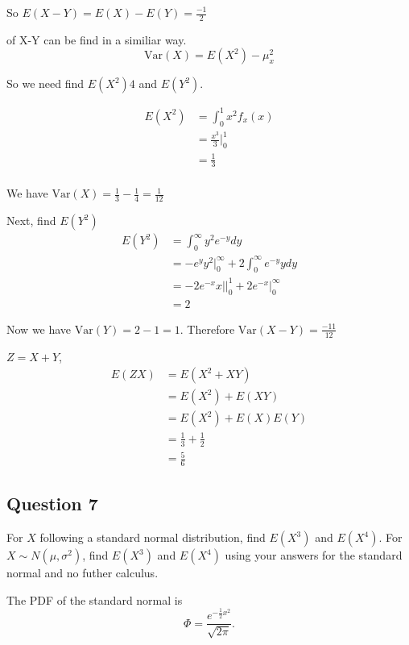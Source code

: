 \documentclass{tufte-book}
\newcommand{\Var}{\mathrm{Var}}
\theoremstyle{mytheoremstyle}
\theoremstyle{mylemstyle}
\theoremstyle{mydefstyle}
\begin{document}
\begin{enumerate}
So $E(X-Y)=E(X)-E(Y)= \frac{-1}{2}$

 of X-Y can be find in a similiar way.
\[ \Var(X) = E(X^2) - \mu_x^2 \]

So we need find $E(X^2)4$ and $E(Y^2)$.

\begin{align*}
E(X^2) &= \int_0^1x^2f_x(x)\\
&= \frac{x^3}{3}\Big|_0^1\\
&=\frac{1}{3}\\
\end{align*}

We have $\Var(X) = \frac{1}{3} - \frac{1}{4} = \frac{1}{12}$

Next, find $E(Y^2)$
\begin{align*}
E(Y^2) &= \int_0^\infty y^2e^{-y}dy\\
&= -e^yy^2\Big|_0^\infty + 2\int_0^\infty e^{-y}ydy\\
&= -2e^{-x}x|\Big|_0^1 + 2e^{-x}\Big|_0^\infty\\
&=2
\end{align*}

Now we have $\Var(Y) = 2 - 1=1$.  Therefore $\Var(X-Y)=\frac{-11}{12}$

 $Z=X+Y$,
\begin{align*}
E(ZX)&=E(X^2+XY)\\
&= E(X^2) + E(XY)\\
&= E(X^2) + E(X)E(Y)\\
&= \frac{1}{3} + \frac{1}{2}\\
&= \frac{5}{6}
\end{align*}

\end{enumerate}


\subsection{Question 7}
For $X$ following a standard normal distribution, find $E(X^3)$ and $E(X^4)$.  For $X\sim N(\mu,\sigma^2)$, find $E(X^3)$ and $E(X^4)$ using your answers for the standard normal and no futher calculus.

The PDF of the standard normal is
\[\Phi = \frac{e^{-\frac{1}{2}x^2}}{\sqrt{2\pi}}. \]
\end{document}
